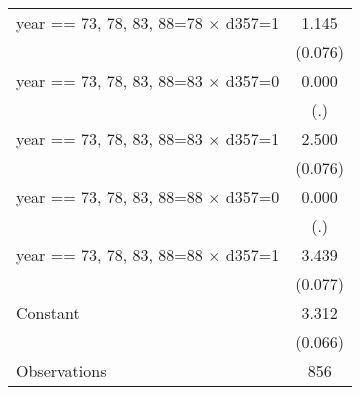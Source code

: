 \begin{table}[htbp]
\begin{tabular}{l*{1}{c}}
year == 73, 78, 83, 88=78 $\times$ d357=1&       1.145\sym{***}\\
                    &     (0.076)         \\
year == 73, 78, 83, 88=83 $\times$ d357=0&       0.000         \\
                    &         (.)         \\
year == 73, 78, 83, 88=83 $\times$ d357=1&       2.500\sym{***}\\
                    &     (0.076)         \\
year == 73, 78, 83, 88=88 $\times$ d357=0&       0.000         \\
                    &         (.)         \\
year == 73, 78, 83, 88=88 $\times$ d357=1&       3.439\sym{***}\\
                    &     (0.077)         \\
Constant            &       3.312\sym{***}\\
                    &     (0.066)         \\
\midrule
Observations        &         856         \\
\bottomrule
\end{tabular}
\end{table}
